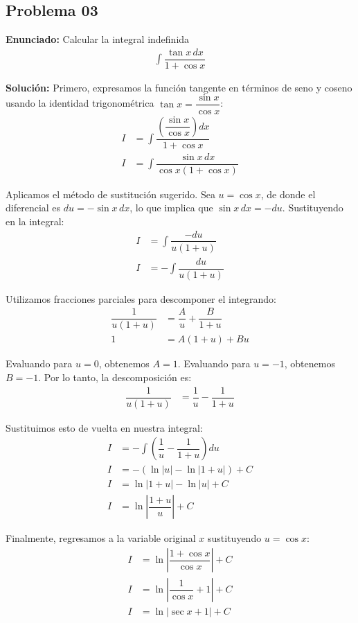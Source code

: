 \subsection*{Problema 03}
\textbf{Enunciado:} Calcular la integral indefinida
\begin{align*}
\int \dfrac{\tan x \, dx}{1 + \cos x}
\end{align*}

\textbf{Solución:}
Primero, expresamos la función tangente en términos de seno y coseno usando la identidad trigonométrica $\tan x = \dfrac{\sin x}{\cos x}$:
\begin{align*}
I &= \int \dfrac{\left(\dfrac{\sin x}{\cos x}\right) dx}{1 + \cos x} \\
I &= \int \dfrac{\sin x \, dx}{\cos x (1 + \cos x)}
\end{align*}

Aplicamos el método de sustitución sugerido. Sea $u = \cos x$, de donde el diferencial es $du = -\sin x \, dx$, lo que implica que $\sin x \, dx = -du$. Sustituyendo en la integral:
\begin{align*}
I &= \int \dfrac{-du}{u (1 + u)} \\
I &= -\int \dfrac{du}{u (1 + u)}
\end{align*}

Utilizamos fracciones parciales para descomponer el integrando:
\begin{align*}
\dfrac{1}{u(1 + u)} &= \dfrac{A}{u} + \dfrac{B}{1 + u} \\
1 &= A(1 + u) + Bu
\end{align*}

Evaluando para $u = 0$, obtenemos $A = 1$. Evaluando para $u = -1$, obtenemos $B = -1$. Por lo tanto, la descomposición es:
\begin{align*}
\dfrac{1}{u(1 + u)} &= \dfrac{1}{u} - \dfrac{1}{1 + u}
\end{align*}

Sustituimos esto de vuelta en nuestra integral:
\begin{align*}
I &= -\int \left( \dfrac{1}{u} - \dfrac{1}{1 + u} \right) du \\
I &= -\left( \ln|u| - \ln|1 + u| \right) + C \\
I &= \ln|1 + u| - \ln|u| + C \\
I &= \ln\left| \dfrac{1 + u}{u} \right| + C
\end{align*}

Finalmente, regresamos a la variable original $x$ sustituyendo $u = \cos x$:
\begin{align*}
I &= \ln\left| \dfrac{1 + \cos x}{\cos x} \right| + C \\
I &= \ln\left| \dfrac{1}{\cos x} + 1 \right| + C \\
I &= \ln|\sec x + 1| + C
\end{align*}

